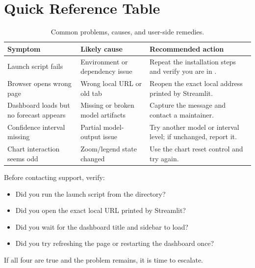 \section{Quick Reference Table}

\begin{table}[H]
    \centering
    \small
    \setlength{\tabcolsep}{5pt}
    \renewcommand{\arraystretch}{1.15}
    \caption{Common problems, causes, and user-side remedies.}
    \begin{tabularx}{\textwidth}{|L{3.0cm}|L{3.8cm}|X|}
        \hline
        \textbf{Symptom} & \textbf{Likely cause} & \textbf{Recommended action} \\
        \hline
        Launch script fails & Environment or dependency issue & Repeat the installation steps and verify you are in . \\
        \hline
        Browser opens wrong page & Wrong local URL or old tab & Reopen the exact local address printed by Streamlit. \\
        \hline
        Dashboard loads but no forecast appears & Missing or broken model artifacts & Capture the message and contact a maintainer. \\
        \hline
        Confidence interval missing & Partial model-output issue & Try another model or interval level; if unchanged, report it. \\
        \hline
        Chart interaction seems odd & Zoom/legend state changed & Use the chart reset control and try again. \\
        \hline
    \end{tabularx}
\end{table}

\begin{tcolorbox}[colback=red!5!white, colframe=red!75!black, title=Quick Diagnostic Checklist]
Before contacting support, verify:
\begin{itemize}
    \item Did you run the launch script from the  directory?
    \item Did you open the exact local URL printed by Streamlit?
    \item Did you wait for the dashboard title and sidebar to load?
    \item Did you try refreshing the page or restarting the dashboard once?
\end{itemize}
If all four are true and the problem remains, it is time to escalate.
\end{tcolorbox}
